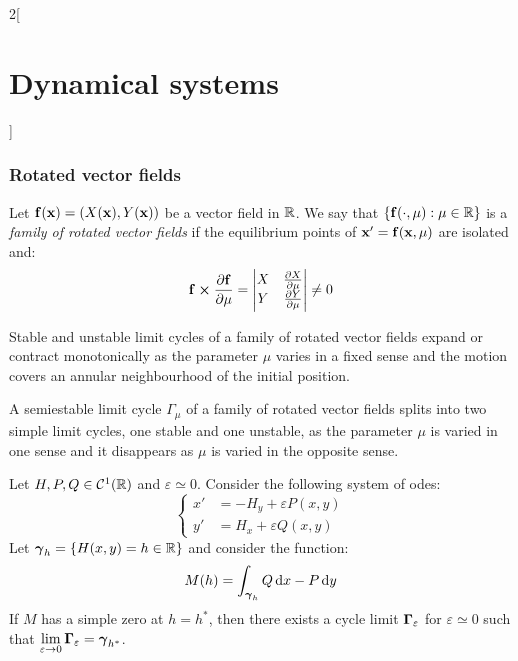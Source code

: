 \documentclass[../../../main_math.tex]{subfiles}
\begin{document}
\begin{multicols}{2}[\section{Dynamical systems}]
  \subsubsection{Rotated vector fields}
  \begin{definition}
    Let $\boldsymbol{\mathrm{f}}(\boldsymbol{\mathrm{x}})=(X(\boldsymbol{\mathrm{x}}),Y(\boldsymbol{\mathrm{x}}))$ be a vector field in $\mathbb{R}$. We say that $\{\boldsymbol{\mathrm{f}}(\cdot,\mu):\mu\in\mathbb{R}\}$ is a \emph{family of rotated vector fields} if the equilibrium points of $\boldsymbol{\mathrm{x}}'=\boldsymbol{\mathrm{f}}(\boldsymbol{\mathrm{x}},\mu)$ are isolated and:
    $$\vf{f}\crossprod\pdv{\vf{f}}{\mu}=
      \begin{vmatrix}
        X & \pdv{X}{\mu} \\
        Y & \pdv{Y}{\mu}
      \end{vmatrix}\ne 0
    $$
  \end{definition}
  \begin{theorem}
    Stable and unstable limit cycles of a family of rotated vector fields expand or contract monotonically as the parameter $\mu$ varies in a fixed sense and the motion covers an annular neighbourhood of the initial position.
  \end{theorem}
  \begin{theorem}
    A semiestable limit cycle $\Gamma_\mu$ of a family of rotated vector fields splits into two simple limit cycles, one stable and one unstable, as the parameter $\mu$ is varied in one sense and it disappears as $\mu$ is varied in the opposite sense.
  \end{theorem}
  \begin{theorem}
    Let $H,P,Q\in\mathcal{C}^1(\mathbb{R})$ and $\varepsilon\simeq 0$. Consider the following system of odes:
    \begin{equation*}
      \left\{
      \begin{aligned}
        x' & =-H_y +\varepsilon P(x,y) \\
        y' & =H_x +\varepsilon Q(x,y)
      \end{aligned}
      \right.
    \end{equation*}
    Let $\boldsymbol{\mathrm{\gamma}}_h=\{H(x,y)=h\in\mathbb{R}\}$ and consider the function: $$M(h)=\int_{\boldsymbol{\mathrm{\gamma}}_h}Q\dd{x}-P\dd{y}$$ If $M$ has a simple zero at $h=h^*$, then there exists a cycle limit $\boldsymbol{\mathrm{\Gamma}}_\varepsilon$ for $\varepsilon\simeq 0$ such that $\displaystyle\lim_{\varepsilon\to 0}\boldsymbol{\mathrm{\Gamma}}_\varepsilon=\boldsymbol{\mathrm{\gamma}}_{h^*}$.
  \end{theorem}

\end{multicols}
\end{document}
